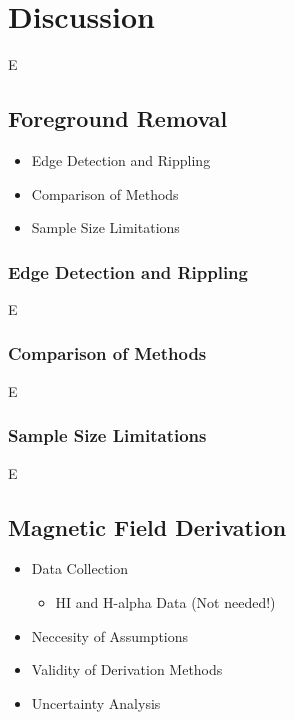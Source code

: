 \chapter{Discussion}
\label{cha:discussion}

E

\section{Foreground Removal}
\label{sec:fr_disc}

\begin{itemize}
    \item Edge Detection and Rippling
    \item Comparison of Methods
    \item Sample Size Limitations
\end{itemize}

\subsection{Edge Detection and Rippling}
\label{ssec:A1}

E

\subsection{Comparison of Methods}
\label{ssec:A2}

E

\subsection{Sample Size Limitations}
\label{ssec:A3}

E

\section{Magnetic Field Derivation}
\label{sec:mag_disc}

\begin{itemize}
    \item Data Collection
    \begin{itemize}
        \item HI and H-alpha Data (Not needed!)
    \end{itemize}
    \item Neccesity of Assumptions
    \item Validity of Derivation Methods
    \item Uncertainty Analysis
\end{itemize}

